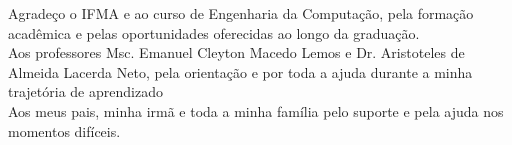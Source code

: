 

\begin{agradecimentos}

	\begin{flushright}
		Agradeço o IFMA e ao curso de Engenharia da Computação, pela formação acadêmica e pelas oportunidades oferecidas ao longo da graduação.\\
		Aos professores Msc. Emanuel Cleyton Macedo Lemos e Dr. Aristoteles de Almeida Lacerda Neto, pela orientação e por toda a ajuda durante a minha trajetória de aprendizado\\
		Aos meus pais, minha irmã e toda a minha família pelo suporte e pela ajuda nos momentos difíceis.
		\vspace{\baselineskip}
	\end{flushright}

\end{agradecimentos}




